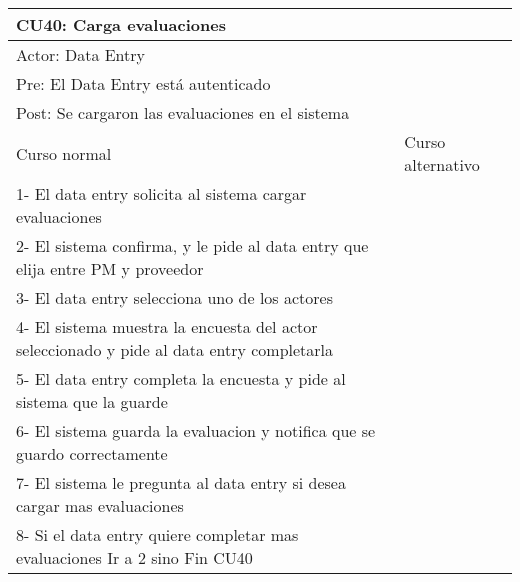 \begin{table}[H]
  \begin{adjustbox}{max width = \textwidth}
  \begin{tabular}{|l|l|}
    \hline
    \multicolumn{2}{|l|}{CU40: Carga evaluaciones} \\\hline
    \multicolumn{2}{|l|}{Actor: Data Entry} \\\hline
    \multicolumn{2}{|l|}{Pre: El Data Entry está autenticado} \\\hline
    \multicolumn{2}{|l|}{Post: Se cargaron las evaluaciones en el sistema} \\\hline
     Curso normal & Curso alternativo\\ \hline
	 1- El data entry solicita al sistema cargar evaluaciones & \\ \hline
	 2- El sistema confirma, y le pide al data entry que elija entre PM y proveedor & \\ \hline
	 3- El data entry selecciona uno de los actores & \\ \hline
     4- El sistema muestra la encuesta del actor seleccionado y pide al data entry completarla & \\ \hline
     5- El data entry completa la encuesta y pide al sistema que la guarde & \\ \hline
	 6- El sistema guarda la evaluacion y notifica que se guardo correctamente& \\ \hline
     7- El sistema le pregunta al data entry si desea cargar mas evaluaciones & \\ \hline
	 8- Si el data entry quiere completar mas evaluaciones Ir a 2 sino Fin CU40 & \\ \hline
  \end{tabular}
  \end{adjustbox}
\end{table}


